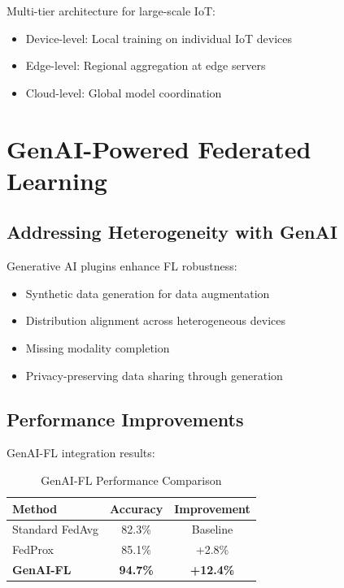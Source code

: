 \documentclass[12pt,a4paper]{article}
\begin{document}
Multi-tier architecture for large-scale IoT:
\begin{itemize}
    \item Device-level: Local training on individual IoT devices
    \item Edge-level: Regional aggregation at edge servers
    \item Cloud-level: Global model coordination
\end{itemize}

\section{GenAI-Powered Federated Learning}

\subsection{Addressing Heterogeneity with GenAI}

Generative AI plugins enhance FL robustness:
\begin{itemize}
    \item Synthetic data generation for data augmentation
    \item Distribution alignment across heterogeneous devices
    \item Missing modality completion
    \item Privacy-preserving data sharing through generation
\end{itemize}

\subsection{Performance Improvements}

GenAI-FL integration results:
\begin{table}[H]
\centering
\caption{GenAI-FL Performance Comparison}
\begin{tabular}{lcc}
\toprule
\textbf{Method} & \textbf{Accuracy} & \textbf{Improvement} \\
\midrule
Standard FedAvg & 82.3\% & Baseline \\
FedProx & 85.1\% & +2.8\% \\
\textbf{GenAI-FL} & \textbf{94.7\%} & \textbf{+12.4\%} \\
\bottomrule
\end{tabular}
\end{table}
\end{document}
